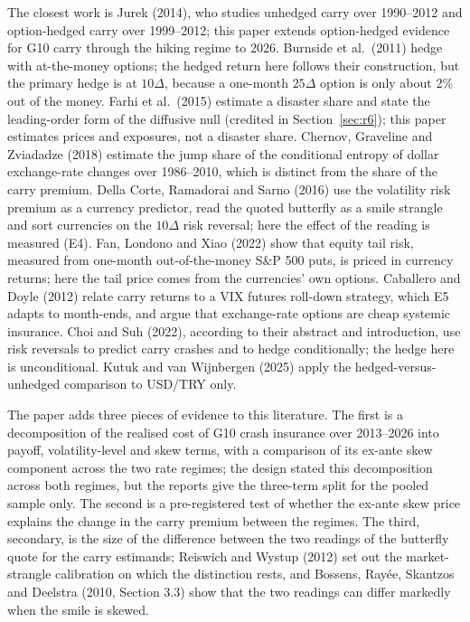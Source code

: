 \documentclass[11pt]{article}
\theoremstyle{result}
\newcommand{\D}{\Delta}
\begin{document}
The closest work is Jurek (2014), who studies unhedged carry over 1990--2012 and option-hedged carry over 1999--2012; this paper extends option-hedged evidence for G10 carry through the hiking regime to 2026. Burnside et al.\ (2011) hedge with at-the-money options; the hedged return here follows their construction, but the primary hedge is at $10\D$, because a one-month $25\D$ option is only about 2\% out of the money. Farhi et al.\ (2015) estimate a disaster share and state the leading-order form of the diffusive null (credited in Section~\ref{sec:r6}); this paper estimates prices and exposures, not a disaster share. Chernov, Graveline and Zviadadze (2018) estimate the jump share of the conditional entropy of dollar exchange-rate changes over 1986--2010, which is distinct from the share of the carry premium. Della Corte, Ramadorai and Sarno (2016) use the volatility risk premium as a currency predictor, read the quoted butterfly as a smile strangle and sort currencies on the $10\D$ risk reversal; here the effect of the reading is measured (E4). Fan, Londono and Xiao (2022) show that equity tail risk, measured from one-month out-of-the-money S\&P 500 puts, is priced in currency returns; here the tail price comes from the currencies' own options. Caballero and Doyle (2012) relate carry returns to a VIX futures roll-down strategy, which E5 adapts to month-ends, and argue that exchange-rate options are cheap systemic insurance. Choi and Suh (2022), according to their abstract and introduction, use risk reversals to predict carry crashes and to hedge conditionally; the hedge here is unconditional. Kutuk and van Wijnbergen (2025) apply the hedged-versus-unhedged comparison to USD/TRY only.

The paper adds three pieces of evidence to this literature. The first is a decomposition of the realised cost of G10 crash insurance over 2013--2026 into payoff, volatility-level and skew terms, with a comparison of its ex-ante skew component across the two rate regimes; the design stated this decomposition across both regimes, but the reports give the three-term split for the pooled sample only. The second is a pre-registered test of whether the ex-ante skew price explains the change in the carry premium between the regimes. The third, secondary, is the size of the difference between the two readings of the butterfly quote for the carry estimands; Reiswich and Wystup (2012) set out the market-strangle calibration on which the distinction rests, and Bossens, Ray\'ee, Skantzos and Deelstra (2010, Section 3.3) show that the two readings can differ markedly when the smile is skewed.
\end{document}
